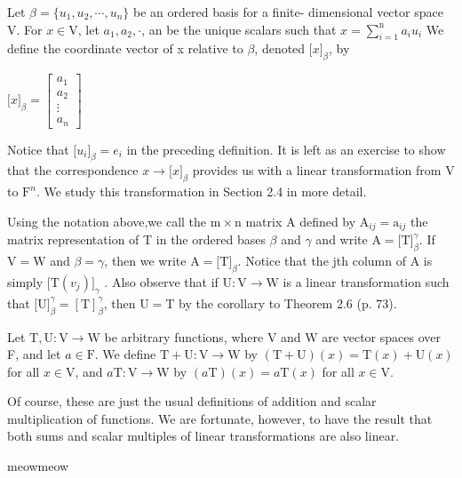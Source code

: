 \newpage
\begin{defn}
$ $\\ Let $\beta = \{ u_1,u_2,\cdots,u_n \}$ be an ordered basis for a finite- dimensional vector space V. For $x \in \mathrm{V}$, let $a_1, a_2, \cdot $, an be the unique scalars such that
$x = \sum_{i=1}^{\mathrm{n}} a_iu_i$
We define the coordinate vector of x relative to $\beta$, denoted $\lbrack x \rbrack_\beta$, by
\begin{center}
	 $\lbrack x \rbrack_\beta = \left[\begin{matrix}
	a_1 \\
	a_2 \\
	\vdots \\
	a_n 	
\end{matrix}\right]$
\end{center}

Notice that $\lbrack u_i \rbrack_\beta = e_i$ in the preceding definition. It is left as an exercise to show that the correspondence $x \rightarrow \lbrack x \rbrack_ \beta$ provides us with a linear transformation from V to $\mathrm{F}^n$. We study this transformation in Section 2.4 in more detail.
\end{defn}


\begin{defn} $ $\\
Using the notation above,we call the $\mathrm{m} \times \mathrm{n}$ matrix A defined by $\mathrm{A}_{ij} = \mathrm{a}_{ij}$ the matrix representation of T in the ordered bases $\beta$ and $\gamma$ and write $\mathrm{A} = \lbrack \mathrm{T} \rbrack^\gamma_\beta$. If $\mathrm{V} = \mathrm{W}$ and $\beta = \gamma$, then we write $\mathrm{A} = \lbrack \mathrm{T}\rbrack_\beta$.
Notice that the jth column of A is simply $\lbrack \mathrm{T} (v_j)\rbrack_\gamma$ . Also observe that if
$\mathrm{U} : \mathrm{V} \rightarrow \mathrm{W}$ is a linear transformation such that $\lbrack \mathrm{U} \rbrack^\gamma_\beta = [\mathrm{T}]^\gamma_\beta$, then $\mathrm{U} = \mathrm{T}$ by the corollary to Theorem 2.6 (p. 73).

\end{defn}

\begin{defn} $ $\\
Let $\mathrm{T} , \mathrm{U}: \mathrm{V} \rightarrow \mathrm{W}$ be arbitrary functions, where V and W are vector spaces over F, and let $a \in \mathrm{F}$. We define $\mathrm{T}+\mathrm{U} : \mathrm{V} \rightarrow \mathrm{W}$ by $(\mathrm{T}+\mathrm{U})(x) = \mathrm{T}(x)+\mathrm{U}(x)$ for all $x \in \mathrm{V}$, and $a\mathrm{T}: \mathrm{V} \rightarrow \mathrm{W}$ by $(a\mathrm{T})(x) = a\mathrm{T}(x)$ for all $x \in \mathrm{V}$.


Of course, these are just the usual definitions of addition and scalar multiplication of functions. We are fortunate, however, to have the result that both sums and scalar multiples of linear transformations are also linear.
\end{defn}

	meowmeow

		

